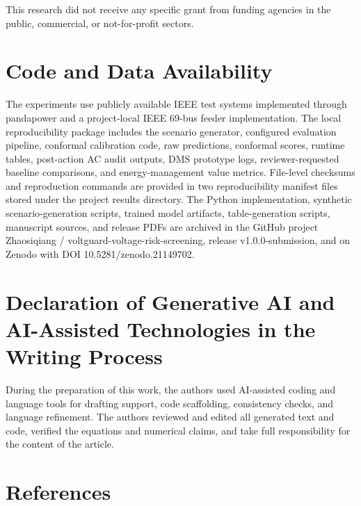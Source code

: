 \documentclass[
  preprint,12pt]{elsarticle}
\begin{document}
This research did not receive any specific grant from funding agencies
in the public, commercial, or not-for-profit sectors.

\section*{Code and Data Availability}\label{code-and-data-availability}

The experiments use publicly available IEEE test systems implemented
through pandapower and a project-local IEEE 69-bus feeder
implementation. The local reproducibility package includes the scenario
generator, configured evaluation pipeline, conformal calibration code,
raw predictions, conformal scores, runtime tables, post-action AC audit
outputs, DMS prototype logs, reviewer-requested baseline comparisons,
and energy-management value metrics. File-level checksums and
reproduction commands are provided in two reproducibility manifest files
stored under the project results directory. The Python implementation,
synthetic scenario-generation scripts, trained model artifacts,
table-generation scripts, manuscript sources, and release PDFs are
archived in the GitHub project Zhaosiqiang /
voltguard-voltage-risk-screening, release v1.0.0-submission, and on
Zenodo with DOI 10.5281/zenodo.21149702.

\section*{Declaration of Generative AI and AI-Assisted Technologies in
the Writing
Process}\label{declaration-of-generative-ai-and-ai-assisted-technologies-in-the-writing-process}

During the preparation of this work, the authors used AI-assisted coding
and language tools for drafting support, code scaffolding, consistency
checks, and language refinement. The authors reviewed and edited all
generated text and code, verified the equations and numerical claims,
and take full responsibility for the content of the article.

\section*{References}\label{references}
\end{document}
